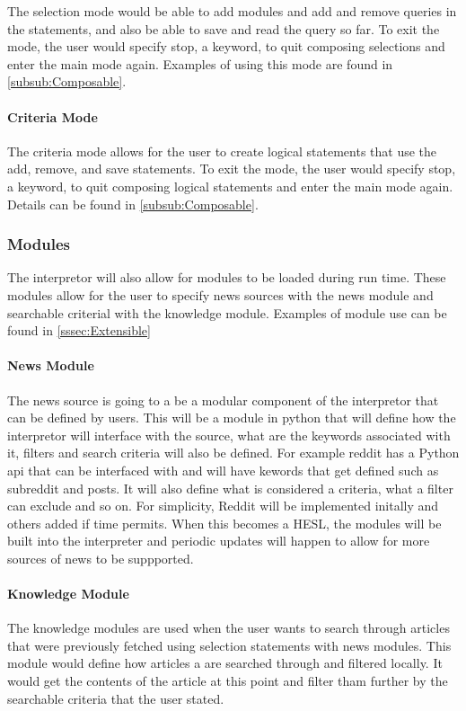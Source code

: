 The selection mode would be able to add modules and add and remove queries in the statements, and also be able to save and read the query so far. To exit the mode, the user would specify stop, a keyword, to quit composing selections and enter the main mode again. Examples of using this mode are found in \autoref{subsub:Composable}. 

\paragraph{Criteria Mode}

The criteria mode allows for the user to create logical statements that use the add, remove, and save statements. To exit the mode, the user would specify stop, a keyword, to quit composing logical statements and enter the main mode again. Details can be found in \autoref{subsub:Composable}.


\subsubsection{Modules}

The interpretor will also allow for modules to be loaded during run time. These modules allow for the user to specify news sources with the news module and searchable criterial with the knowledge module. Examples of module use can be found in \autoref{sssec:Extensible}

\paragraph{News Module }

The news source is going to a be a modular component of the interpretor that can be defined by users. This will be a module in python that will define how the interpretor will interface with the source, what are the keywords associated with it, filters and search criteria will also be defined. For example reddit has a Python api that can be interfaced with and will have kewords that get defined such as subreddit and posts. It will also define what is considered a criteria, what a filter can exclude and so on. For simplicity, Reddit will be implemented initally and others added if time permits. When this becomes a HESL, the modules will be built into the interpreter and periodic updates will happen to allow for more sources of news to be suppported.\\


\paragraph{Knowledge Module}
The knowledge modules are used when the user wants to search through articles that were previously fetched using selection statements with news modules. This module would define how articles a are searched through and filtered locally. It would get the contents of the article at this point and filter tham further by the searchable criteria that the user stated.
